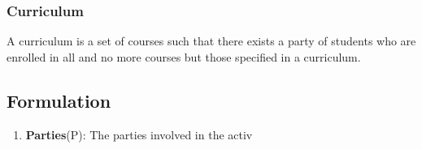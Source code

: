 \documentclass[11pt]{book}
\begin{document}
\subsubsection{Curriculum}
A curriculum is a set of courses such that there exists a party of students who are enrolled in all and no more courses but those specified in a curriculum.

\subsection{Formulation}

\begin{enumerate}
	\item \textbf{Parties}(P): The parties involved in the activ 
\end{enumerate}
\end{document}
